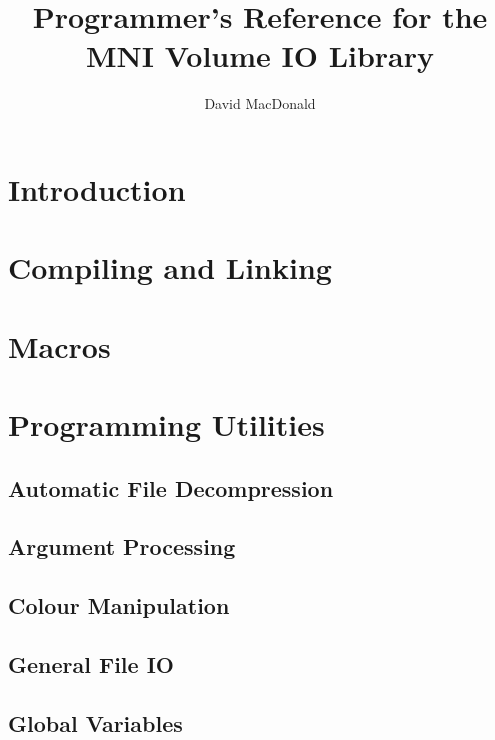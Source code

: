 
\title{Programmer's Reference for the MNI Volume IO Library}
\author{David MacDonald}



\maketitle

\newpage

\tableofcontents

\newpage

\section{Introduction}

\section{Compiling and Linking}

\section{Macros}

\section{Programming Utilities}

\subsection{Automatic File Decompression}

\subsection{Argument Processing}

\subsection{Colour Manipulation}

\subsection{General File IO}

\subsection{Global Variables}

